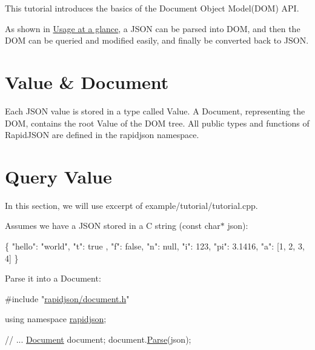 This tutorial introduces the basics of the Document Object Model(\+D\+O\+M) A\+PI.

As shown in \hyperlink{index}{Usage at a glance}, a J\+S\+ON can be parsed into D\+OM, and then the D\+OM can be queried and modified easily, and finally be converted back to J\+S\+ON.\hypertarget{md_Cadriciel_Commun_Externe_RapidJSON_doc_tutorial.zh-cn_ValueDocument}{}\section{Value \& Document}\label{md_Cadriciel_Commun_Externe_RapidJSON_doc_tutorial.zh-cn_ValueDocument}
Each J\+S\+ON value is stored in a type called {\ttfamily Value}. A {\ttfamily Document}, representing the D\+OM, contains the root {\ttfamily Value} of the D\+OM tree. All public types and functions of Rapid\+J\+S\+ON are defined in the {\ttfamily rapidjson} namespace.\hypertarget{md_Cadriciel_Commun_Externe_RapidJSON_doc_tutorial.zh-cn_QueryValue}{}\section{Query Value}\label{md_Cadriciel_Commun_Externe_RapidJSON_doc_tutorial.zh-cn_QueryValue}
In this section, we will use excerpt of {\ttfamily example/tutorial/tutorial.\+cpp}.

Assumes we have a J\+S\+ON stored in a C string ({\ttfamily const char$\ast$ json})\+: 
\begin{DoxyCode}
\{
    \textcolor{stringliteral}{"hello"}: \textcolor{stringliteral}{"world"},
    \textcolor{stringliteral}{"t"}: true ,
    \textcolor{stringliteral}{"f"}: \textcolor{keyword}{false},
    \textcolor{stringliteral}{"n"}: null,
    \textcolor{stringliteral}{"i"}: 123,
    \textcolor{stringliteral}{"pi"}: 3.1416,
    \textcolor{stringliteral}{"a"}: [1, 2, 3, 4]
\}
\end{DoxyCode}


Parse it into a {\ttfamily Document}\+: 
\begin{DoxyCode}
\textcolor{preprocessor}{#include "\hyperlink{document_8h}{rapidjson/document.h}"}

\textcolor{keyword}{using namespace }\hyperlink{namespacerapidjson}{rapidjson};

\textcolor{comment}{// ...}
\hyperlink{class_generic_document}{Document} document;
document.\hyperlink{class_generic_document_aebd4e7fddd80c1e1174837aee6d2159b}{Parse}(json);
\end{DoxyCode}


